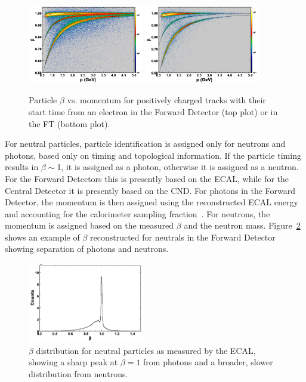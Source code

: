 \begin{figure}[t]
\centering
\includegraphics[width=0.45\textwidth]{pics/ftof_betap.png}
\includegraphics[width=0.45\textwidth]{pics/ft_betap.png}
\caption{Particle $\beta$ vs. momentum for positively charged tracks with their start time from an electron in
the Forward Detector (top plot) or in the FT (bottom plot).}
\label{fig:betavsp}
\end{figure}

For neutral particles, particle identification is assigned only for neutrons and photons, based only on timing and
topological information. If the particle timing results in $\beta\sim$1, it is assigned as a photon, otherwise it
is assigned as a neutron. For the Forward Detectors this is presently based on the ECAL, while for the Central
Detector it is presently based on the CND. For photons in the Forward Detector, the momentum is then assigned
using the reconstructed ECAL energy and accounting for the calorimeter sampling fraction~\cite{ecal-nim}. For
neutrons, the momentum is assigned based on the measured $\beta$ and the neutron mass.
Figure~\ref{fig:neutbeta} shows an example of $\beta$ reconstructed for neutrals in the Forward Detector
showing separation of photons and neutrons.

\begin{figure}
\centering
\includegraphics[width=0.45\textwidth]{pics/neutral_beta.png}
\caption{$\beta$ distribution for neutral particles as measured by the ECAL, showing a sharp peak at $\beta=1$
  from photons and a broader, slower distribution from neutrons.}
\label{fig:neutbeta}
\end{figure}

